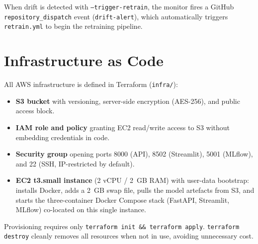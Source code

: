 When drift is detected with \texttt{--trigger-retrain}, the monitor fires a
GitHub \texttt{repository\_dispatch} event (\texttt{drift-alert}), which
automatically triggers \texttt{retrain.yml} to begin the retraining pipeline.

\section{Infrastructure as Code}

All AWS infrastructure is defined in Terraform (\texttt{infra/}):

\begin{itemize}
    \item \textbf{S3 bucket} with versioning, server-side encryption (AES-256),
          and public access block.
    \item \textbf{IAM role and policy} granting EC2 read/write access to S3
          without embedding credentials in code.
    \item \textbf{Security group} opening ports 8000 (API), 8502 (Streamlit),
          5001 (MLflow), and 22 (SSH, IP-restricted by default).
    \item \textbf{EC2 t3.small instance} (2 vCPU / 2~GB RAM) with user-data
          bootstrap: installs Docker, adds a 2~GB swap file, pulls the model
          artefacts from S3, and starts the three-container Docker Compose stack
          (FastAPI, Streamlit, MLflow) co-located on this single instance.
\end{itemize}

Provisioning requires only \texttt{terraform init \&\& terraform apply}.
\texttt{terraform destroy} cleanly removes all resources when not in use,
avoiding unnecessary cost.

